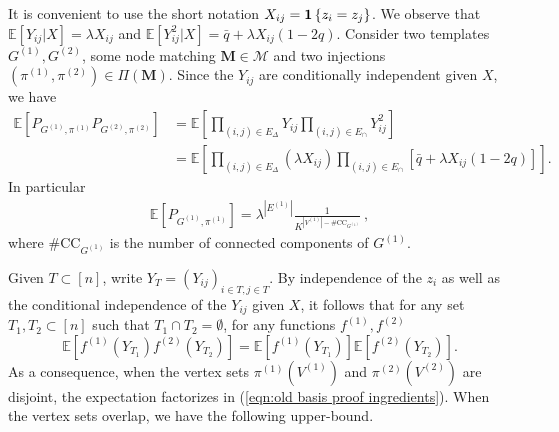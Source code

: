 \documentclass[final]{colt2026}
\newcommand{\1}{\mathbf{1}}
\newcommand{\ch}[1]{\textcolor{green}{#1}}
\newcommand{\bbE}{\mathbb{E}}
\newcommand{\bbP}{\mathbb{P}}
\newcommand{\pa}[1]{\left(#1\right)}
\newcommand{\ac}[1]{\left\{#1\right\}}
\newcommand{\cro}[1]{\left[#1\right]}
\begin{document}
It is convenient to use the short notation $X_{ij}={\bf 1}\ac{z_{i}=z_{j}}$.
We observe that $\bbE\cro{Y_{ij}|X}=\lambda X_{ij}$ and 
$\bbE\cro{Y_{ij}^2|X}= \bar q+ \lambda X_{ij}(1-2q)$. 
Consider two templates $G^{(1)}, G^{(2)}$, some node matching $\mathbf M \in \mathcal M$ and two injections $(\pi^{(1)}, \pi^{(2)})\in \Pi(\mathbf{M})$. Since the $Y_{ij}$ are conditionally independent given $X$, we have %
\begin{align}
   \mathbb{E}\left[P_{G^{(1)}, \pi^{(1)}}P_{G^{(2)}, \pi^{(2)}}\right] 
    & = \bbE\cro{\prod_{(i,j)\in E_{\Delta}}Y_{ij}\prod_{(i,j)\in E_{\cap}}Y_{ij}^2}\nonumber\\
    &=   \bbE\cro{\prod_{(i,j)\in E_{\Delta}} (\lambda X_{ij}) \prod_{(i,j)\in E_{\cap}}[\bar q+\lambda X_{ij}(1-2q)]}.\label{eqn:old basis proof ingredients}%
\end{align}
In particular
\begin{align}\label{eq:comp}
    \mathbb E\left[P_{G^{(1)}, \pi^{(1)}}\right] =   \lambda^{|E^{(1)}|} \frac{1}{K^{|V^{(1)}| - \#\mathrm{CC}_{G^{(1)}}}}\ , 
\end{align}
where $\#\mathrm{CC}_{G^{(1)}}$ is the number of connected components of $G^{(1)}$. 

Given $T\subset [n]$, write $Y_{T}= (Y_{ij})_{i\in T,j\in T}$.  By independence of the $z_i$ as well as the conditional independence of the $Y_{ij}$ given $X$, it follows 
that for any set $T_1,T_2\subset [n]$ such that $T_1\cap T_2=\emptyset$, 
for any functions $f^{(1)},f^{(2)}$ %
\begin{equation}\label{eq:indep}
\mathbb E\left[f^{(1)}(Y_{T_1})f^{(2)}(Y_{T_2}) \right] = \mathbb E\left[f^{(1)}(Y_{T_1})\right]\mathbb E\left[f^{(2)}(Y_{T_2}) \right].
\end{equation}
As a consequence, when the vertex sets $\pi^{(1)}(V^{(1)})$ and $\pi^{(2)}(V^{(2)})$ are disjoint, the expectation factorizes in  (\ref{eqn:old basis proof ingredients}).
When the vertex sets overlap, we have the following upper-bound.
\end{document}
